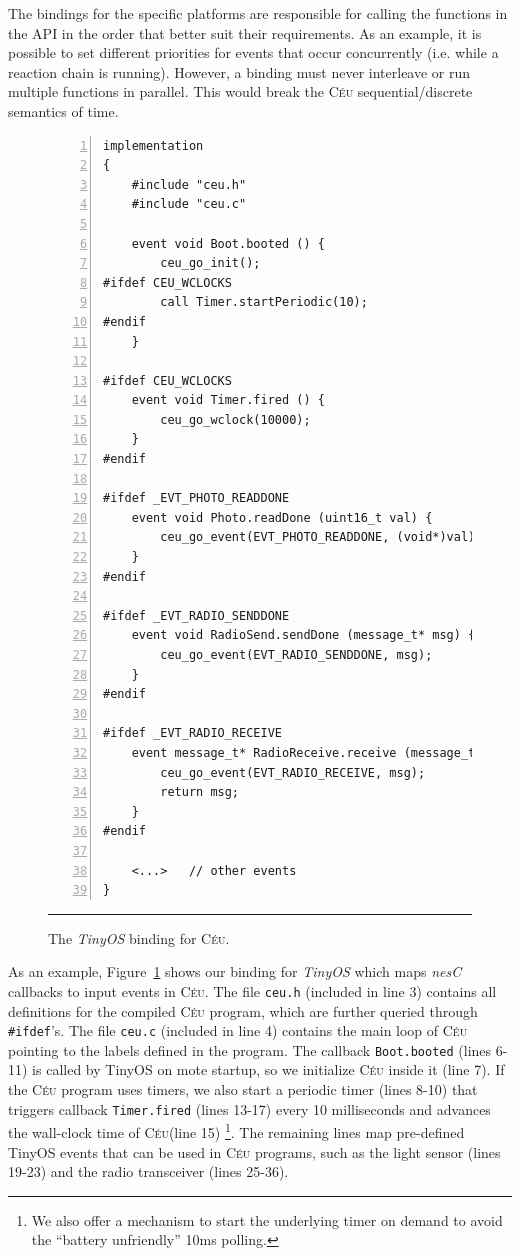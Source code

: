 \documentclass{sigplanconf}
\newcommand{\CEU}{\textsc{C\'{e}u}\xspace}
\newcommand{\code}[1] {{\small{\texttt{#1}}}}
\newcommand{\1}{\;}
\newcommand{\2}{\;\;}
\newcommand{\3}{\;\;\;}
\newcommand{\5}{\;\;\;\;\;}
\begin{document}
The bindings for the specific platforms are responsible for calling the 
functions in the API in the order that better suit their requirements.
As an example, it is possible to set different priorities for events that occur 
concurrently (i.e. while a reaction chain is running).
However, a binding must never interleave or run multiple functions in parallel.
This would break the \CEU sequential/discrete semantics of time.


\begin{figure}[t]
\begin{lstlisting}[numbers=left,xleftmargin=2em]
implementation
{
    #include "ceu.h"
    #include "ceu.c"

    event void Boot.booted () {
        ceu_go_init();
#ifdef CEU_WCLOCKS
        call Timer.startPeriodic(10);
#endif
    }
    
#ifdef CEU_WCLOCKS
    event void Timer.fired () {
        ceu_go_wclock(10000);
    }
#endif

#ifdef _EVT_PHOTO_READDONE
    event void Photo.readDone (uint16_t val) {
        ceu_go_event(EVT_PHOTO_READDONE, (void*)val);
    }
#endif

#ifdef _EVT_RADIO_SENDDONE
    event void RadioSend.sendDone (message_t* msg) {
        ceu_go_event(EVT_RADIO_SENDDONE, msg);
    }
#endif

#ifdef _EVT_RADIO_RECEIVE
    event message_t* RadioReceive.receive (message_t* msg) {
        ceu_go_event(EVT_RADIO_RECEIVE, msg);
        return msg;
    }
#endif

    <...>   // other events
}
\end{lstlisting}
\rule{14cm}{0.37pt}
\caption{
The \emph{TinyOS} binding for \CEU.
\label{lst.impl.tinyos}
}
\end{figure}

As an example, Figure~\ref{lst.impl.tinyos} shows our binding for \emph{TinyOS} 
which maps \emph{nesC} callbacks to input events in \CEU.
%
The file \code{ceu.h} (included in line 3) contains all definitions for the 
compiled \CEU program, which are further queried through \code{\#ifdef}'s.
The file \code{ceu.c} (included in line 4) contains the main loop of \CEU 
pointing to the labels defined in the program.
The callback \code{Boot.booted} (lines 6-11) is called by TinyOS on mote 
startup, so we initialize \CEU inside it (line 7).
If the \CEU program uses timers, we also start a periodic timer (lines 8-10) 
that triggers callback \code{Timer.fired} (lines 13-17) every 10 milliseconds 
and advances the wall-clock time of \CEU (line 15)%
\footnote{We also offer a mechanism to start the underlying timer on demand to
avoid the ``battery unfriendly'' 10ms polling.}.
The remaining lines map pre-defined TinyOS events that can be used in \CEU 
programs, such as the light sensor (lines 19-23) and the radio transceiver 
(lines 25-36).
\appendix
\end{document}
